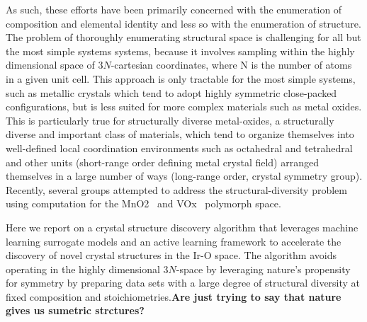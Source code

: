 As such, these efforts have been primarily concerned with the enumeration of composition and elemental identity and less so with the enumeration of structure.
%
The problem of thoroughly enumerating structural space is challenging for all but the most simple systems systems, because it involves sampling within the highly dimensional space of $3N$-cartesian coordinates, where N is the number of atoms in a given unit cell.
This approach is only tractable for the most simple systems,
such as metallic crystals which tend to adopt highly symmetric close-packed configurations, but is less suited for more complex materials such as metal oxides.
%
This is particularly true for structurally diverse metal-oxides, a structurally diverse and important class of materials, which tend to organize themselves into well-defined local coordination environments such as octahedral and tetrahedral and other units (short-range order defining metal crystal field) arranged themselves in a large number of ways (long-range order, crystal symmetry group). Recently, several groups attempted to address the structural-diversity problem using computation for the MnO2~\cite{} and VOx~\cite{} polymorph space.

%
%
Here we report on a crystal structure discovery  algorithm that leverages machine learning surrogate models and an active learning framework to accelerate the discovery of novel crystal structures in the Ir-O space.
%
The algorithm avoids operating in the highly dimensional $3N$-space by leveraging nature's propensity for symmetry by preparing data sets with a large degree of structural diversity at fixed composition and stoichiometries.{\bf Are just trying to say that nature gives us sumetric strctures? }
%
%


